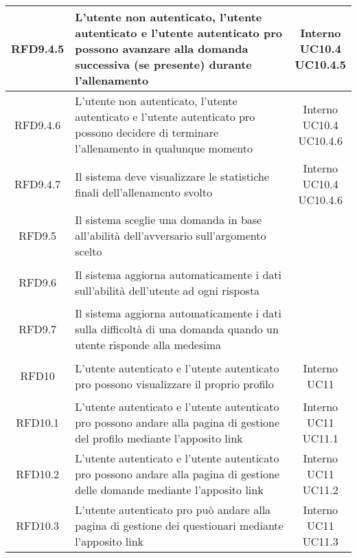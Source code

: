 \begin{longtable}{|c|>{\centering}m{7cm}|c|}
			 \hypertarget{{RFD9.4.5}}{{RFD9.4.5}} & L'utente non autenticato, l'utente autenticato e l'utente autenticato pro possono avanzare alla domanda successiva (se presente) durante l'allenamento & \makecell{Interno\\ UC10.4 \\UC10.4.5 } \\ \hline
			 \hypertarget{{RFD9.4.6}}{{RFD9.4.6}} & L'utente non autenticato, l'utente autenticato e l'utente autenticato pro possono decidere di terminare l'allenamento in qualunque momento & \makecell{Interno\\ UC10.4 \\UC10.4.6 } \\ \hline
			 \hypertarget{{RFD9.4.7}}{{RFD9.4.7}} & Il sistema deve visualizzare le statistiche finali dell'allenamento svolto & \makecell{Interno\\ UC10.4 \\UC10.4.6 } \\ \hline
			 \hypertarget{{RFD9.5}}{{RFD9.5}} & Il sistema sceglie una domanda in base all'abilità dell'avversario sull'argomento scelto & \makecell{Interno } \\ \hline
			 \hypertarget{{RFD9.6}}{{RFD9.6}} & Il sistema aggiorna automaticamente i dati sull'abilità dell'utente ad ogni risposta & \makecell{Interno } \\ \hline
			 \hypertarget{{RFD9.7}}{{RFD9.7}} & Il sistema aggiorna automaticamente i dati sulla difficoltà di una domanda quando un utente risponde alla medesima & \makecell{Interno } \\ \hline
			 \hypertarget{{RFD10}}{{RFD10}} & L’utente autenticato e l’utente autenticato pro possono visualizzare il proprio profilo & \makecell{Interno\\ UC11 } \\ \hline
			 \hypertarget{{RFD10.1}}{{RFD10.1}} & L’utente autenticato e l’utente autenticato pro possono andare alla pagina di gestione del profilo mediante l’apposito link & \makecell{Interno\\ UC11 \\UC11.1 } \\ \hline
			 \hypertarget{{RFD10.2}}{{RFD10.2}} & L’utente autenticato e l’utente autenticato pro possono andare alla pagina di gestione delle domande mediante l’apposito link & \makecell{Interno\\ UC11 \\UC11.2 } \\ \hline
			 \hypertarget{{RFD10.3}}{{RFD10.3}} & L’utente autenticato pro può andare alla pagina di gestione dei questionari mediante l’apposito link & \makecell{Interno\\ UC11 \\UC11.3 } \\ \hline

\end{longtable}
